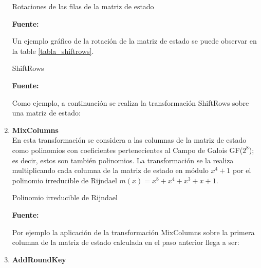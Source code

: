 \documentclass[../main/main.tex]{subfiles}
\begin{document}
\begin{enumerate}[label=\textbf{\arabic*}.]
        \begin{table}[H]
          \centering
          \caption{Rotaciones de las filas de la matriz de estado}
          
          \caption*{\textbf{Fuente:} \cite{report:seguridad_europea_eeuu}}
          \label{tabla_rotaciones_estado}
        \end{table}

        Un ejemplo gráfico de la rotación de la matriz de estado se puede observar en la table \ref{tabla_shiftrows}.

        \begin{table}[H]
          \centering
          \caption{ShiftRows}
          
          \caption*{\textbf{Fuente:} \cite{report:seguridad_europea_eeuu}}
          \label{tabla_shiftrows}
        \end{table}

        Como ejemplo, a continuación se realiza la transformación ShiftRows sobre una matriz de estado:

        \begin{table}[H]
          \centering
          
        \end{table}

      \item \textbf{MixColumns} \\
        En esta transformación se considera a las columnas de la matriz de estado como polinomios con coeficientes pertenecientes al Campo de Galois GF($2^8$); es decir, estos son también polinomios. La transformación se la realiza multiplicando cada columna de la matriz de estado en módulo $x^4 + 1$ por el polinomio irreducible de Rijndael $m(x) = x^8 + x^4 + x^3 + x + 1$.

        \begin{table}[H]
          \centering
          \caption{Polinomio irreducible de Rijndael}
          
          \caption*{\textbf{Fuente:} \cite{report:seguridad_europea_eeuu}}
        \end{table}

        Por ejemplo la aplicación de la transformación MixColumns sobre la primera columna de la matriz de estado calculada en el paso anterior llega a ser:

        

      \item \textbf{AddRoundKey} \\
        





    \end{enumerate}
\end{document}
